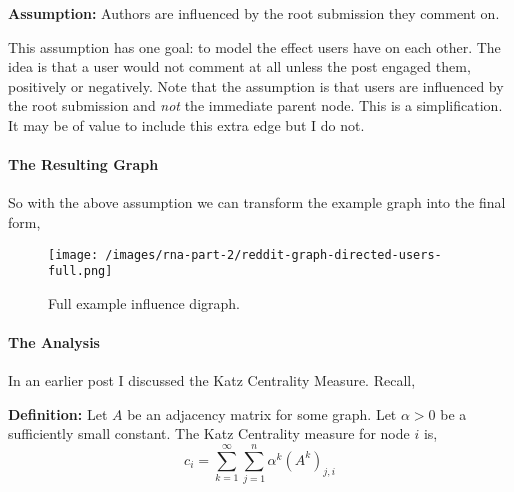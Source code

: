 \textbf{Assumption:} Authors are influenced by the root submission they comment on.

This assumption has one goal: to model the effect users have on each other.
The idea is that a user would not comment at all unless the post engaged them, positively or negatively.
Note that the assumption is that users are influenced by the root submission and \emph{not} the immediate parent node.
This is a simplification. It may be of value to include this extra edge but I do not.

\paragraph{The Resulting Graph}
So with the above assumption we can transform the example graph into the final form,
%
\begin{figure}
    \texttt{[image: /images/rna-part-2/reddit-graph-directed-users-full.png]}
    \caption{Full example influence digraph.}
\end{figure}
%

\paragraph{The Analysis}
In an earlier post I discussed the Katz Centrality Measure. Recall,

\textbf{Definition:} Let \(A\) be an adjacency matrix for some graph.
Let \(\alpha > 0\) be a sufficiently small constant.
The Katz Centrality measure for node \(i\) is,
\[
  c_i = \sum_{k=1}^{\infty}{ \sum_{j=1}^{n}{ \alpha^k (A^k)_{j,i} } }
\]

